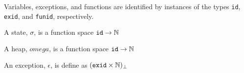 Variables, exceptions, and functions are identified by instances of the types \verb|id|, \verb|exid|, and \verb|funid|, respectively.

A state, $\sigma$, is a function space $\verb|id| \rightarrow \mathbb{N}$

A heap, $omega$, is a function space $\verb|id| \rightarrow \mathbb{N}$

An exception, $\epsilon$, is define as $(\verb|exid|\times\mathbb{N})_\bot$